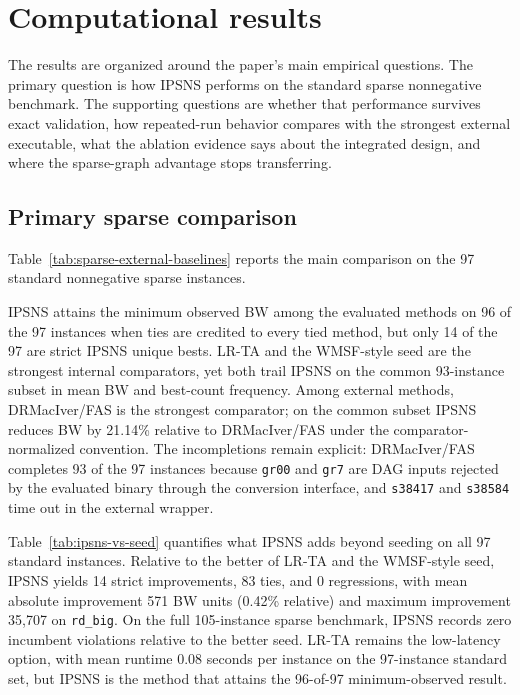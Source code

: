 \section{Computational results}
\label{sec:results}

The results are organized around the paper's main empirical questions. The primary question is how IPSNS performs on the standard sparse nonnegative benchmark. The supporting questions are whether that performance survives exact validation, how repeated-run behavior compares with the strongest external executable, what the ablation evidence says about the integrated design, and where the sparse-graph advantage stops transferring.

\subsection{Primary sparse comparison}

Table~\ref{tab:sparse-external-baselines} reports the main comparison on the 97 standard nonnegative sparse instances.



IPSNS attains the minimum observed BW among the evaluated methods on 96 of the 97 instances when ties are credited to every tied method, but only 14 of the 97 are strict IPSNS unique bests. LR-TA and the WMSF-style seed are the strongest internal comparators, yet both trail IPSNS on the common 93-instance subset in mean BW and best-count frequency. Among external methods, DRMacIver/FAS is the strongest comparator; on the common subset IPSNS reduces BW by 21.14\% relative to DRMacIver/FAS under the comparator-normalized convention. The incompletions remain explicit: DRMacIver/FAS completes 93 of the 97 instances because \texttt{gr00} and \texttt{gr7} are DAG inputs rejected by the evaluated binary through the conversion interface, and \texttt{s38417} and \texttt{s38584} time out in the external wrapper.

Table~\ref{tab:ipsns-vs-seed} quantifies what IPSNS adds beyond seeding on all 97 standard instances. Relative to the better of LR-TA and the WMSF-style seed, IPSNS yields 14 strict improvements, 83 ties, and 0 regressions, with mean absolute improvement 571 BW units (0.42\% relative) and maximum improvement 35{,}707 on \texttt{rd\_big}. On the full 105-instance sparse benchmark, IPSNS records zero incumbent violations relative to the better seed. LR-TA remains the low-latency option, with mean runtime \(0.08\) seconds per instance on the 97-instance standard set, but IPSNS is the method that attains the 96-of-97 minimum-observed result.

